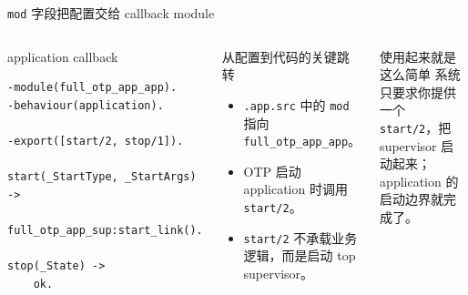 \documentclass[aspectratio=169, 9pt]{beamer}
\newcommand{\code}[1]{\texttt{#1}}
\begin{document}
\begin{frame}[fragile]{\code{mod} 字段把配置交给 callback module}
  \begin{columns}[T,onlytextwidth]
    \begin{block}{application callback}
\begin{lstlisting}
-module(full_otp_app_app).
-behaviour(application).

-export([start/2, stop/1]).

start(_StartType, _StartArgs) ->
    full_otp_app_sup:start_link().

stop(_State) ->
    ok.
\end{lstlisting}
    \end{block}
    \footnotesize
    \begin{exampleblock}{从配置到代码的关键跳转}
      \begin{itemize}
        \item \code{.app.src} 中的 \code{mod} 指向 \code{full\_otp\_app\_app}。
        \item OTP 启动 application 时调用 \code{start/2}。
        \item \code{start/2} 不承载业务逻辑，而是启动 top supervisor。
      \end{itemize}
    \end{exampleblock}
    \vspace{0.15cm}
    \begin{alertblock}{使用起来就是这么简单}
      系统只要求你提供一个 \code{start/2}，把 supervisor 启动起来；application 的启动边界就完成了。
    \end{alertblock}
  \end{columns}
\end{frame}
\end{document}
